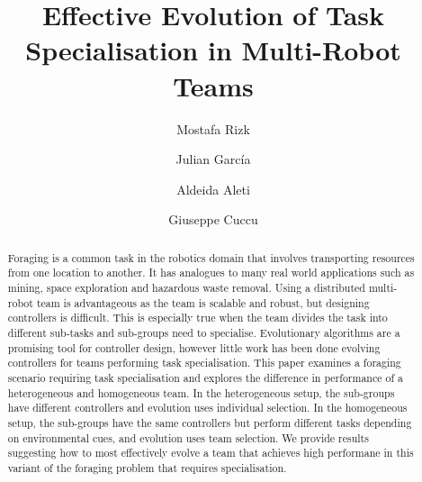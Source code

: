 \documentclass[sigconf]{aamas}  %
\begin{document}
\title{Effective Evolution of Task Specialisation in Multi-Robot Teams}  

 \author{Mostafa Rizk}

 \author{Julian Garc\'ia}

 \author{Aldeida Aleti}
 
  \author{Giuseppe Cuccu}



\begin{abstract}  %

Foraging is a common task in the robotics domain that involves transporting resources from one location to another. It has analogues to many real world applications such as mining, space exploration and hazardous waste removal. Using a distributed multi-robot team is advantageous as the team is scalable and robust, but designing controllers is difficult. This is especially true when the team divides the task into different sub-tasks and sub-groups need to specialise. Evolutionary algorithms are a promising tool for controller design, however little work has been done evolving controllers for teams performing task specialisation. This paper examines a foraging scenario requiring task specialisation and explores the difference in performance of a heterogeneous and homogeneous team. In the heterogeneous setup, the sub-groups have different controllers and evolution uses individual selection. In the homogeneous setup, the sub-groups have the same controllers but perform different tasks depending on environmental cues, and evolution uses team selection. We provide results suggesting how to most effectively evolve a team that achieves high performane in this variant of the foraging problem that requires specialisation.

\end{abstract}
\end{document}
